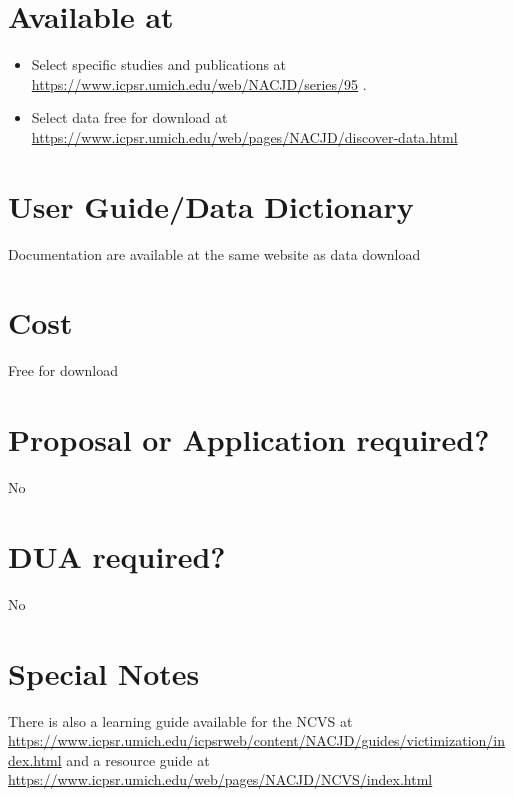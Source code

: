 \documentclass[
]{book}
\providecommand{\tightlist}{%
  \setlength{\itemsep}{0pt}\setlength{\parskip}{0pt}}
\begin{document}
\hypertarget{available-at-45}{%
\section{Available at}\label{available-at-45}}

\begin{itemize}
\tightlist
\item
  Select specific studies and publications at \url{https://www.icpsr.umich.edu/web/NACJD/series/95} .
\item
  Select data free for download at \url{https://www.icpsr.umich.edu/web/pages/NACJD/discover-data.html}
\end{itemize}

\hypertarget{user-guidedata-dictionary-45}{%
\section{User Guide/Data Dictionary}\label{user-guidedata-dictionary-45}}

Documentation are available at the same website as data download

\hypertarget{cost-45}{%
\section{Cost}\label{cost-45}}

Free for download

\hypertarget{proposal-or-application-required-45}{%
\section{Proposal or Application required?}\label{proposal-or-application-required-45}}

No

\hypertarget{dua-required-45}{%
\section{DUA required?}\label{dua-required-45}}

No

\hypertarget{special-notes-45}{%
\section{Special Notes}\label{special-notes-45}}

There is also a learning guide available for the NCVS at \url{https://www.icpsr.umich.edu/icpsrweb/content/NACJD/guides/victimization/index.html} and a resource guide at \url{https://www.icpsr.umich.edu/web/pages/NACJD/NCVS/index.html}
\end{document}
